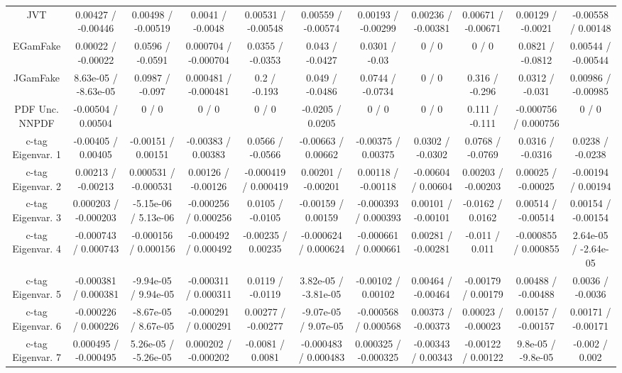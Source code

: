 \begin{table}[htbp]
\begin{center}
\begin{tabular}{|c|c|c|c|c|c|c|c|c|c|c|}
  JVT & 0.00427 / -0.00446 & 0.00498 / -0.00519 & 0.0041 / -0.0048 & 0.00531 / -0.00548 & 0.00559 / -0.00574 & 0.00193 / -0.00299 & 0.00236 / -0.00381 & 0.00671 / -0.00671 & 0.00129 / -0.0021 & -0.00558 / 0.00148 \\ 
  EGamFake & 0.00022 / -0.00022 & 0.0596 / -0.0591 & 0.000704 / -0.000704 & 0.0355 / -0.0353 & 0.043 / -0.0427 & 0.0301 / -0.03 & 0 / 0 & 0 / 0 & 0.0821 / -0.0812 & 0.00544 / -0.00544 \\ 
  JGamFake & 8.63e-05 / -8.63e-05 & 0.0987 / -0.097 & 0.000481 / -0.000481 & 0.2 / -0.193 & 0.049 / -0.0486 & 0.0744 / -0.0734 & 0 / 0 & 0.316 / -0.296 & 0.0312 / -0.031 & 0.00986 / -0.00985 \\ 
  PDF Unc. NNPDF & -0.00504 / 0.00504 & 0 / 0 & 0 / 0 & 0 / 0 & -0.0205 / 0.0205 & 0 / 0 & 0 / 0 & 0.111 / -0.111 & -0.000756 / 0.000756 & 0 / 0 \\ 
  c-tag Eigenvar. 1 & -0.00405 / 0.00405 & -0.00151 / 0.00151 & -0.00383 / 0.00383 & 0.0566 / -0.0566 & -0.00663 / 0.00662 & -0.00375 / 0.00375 & 0.0302 / -0.0302 & 0.0768 / -0.0769 & 0.0316 / -0.0316 & 0.0238 / -0.0238 \\ 
  c-tag Eigenvar. 2 & 0.00213 / -0.00213 & 0.000531 / -0.000531 & 0.00126 / -0.00126 & -0.000419 / 0.000419 & 0.00201 / -0.00201 & 0.00118 / -0.00118 & -0.00604 / 0.00604 & 0.00203 / -0.00203 & 0.00025 / -0.00025 & -0.00194 / 0.00194 \\ 
  c-tag Eigenvar. 3 & 0.000203 / -0.000203 & -5.15e-06 / 5.13e-06 & -0.000256 / 0.000256 & 0.0105 / -0.0105 & -0.00159 / 0.00159 & -0.000393 / 0.000393 & 0.00101 / -0.00101 & -0.0162 / 0.0162 & 0.00514 / -0.00514 & 0.00154 / -0.00154 \\ 
  c-tag Eigenvar. 4 & -0.000743 / 0.000743 & -0.000156 / 0.000156 & -0.000492 / 0.000492 & -0.00235 / 0.00235 & -0.000624 / 0.000624 & -0.000661 / 0.000661 & 0.00281 / -0.00281 & -0.011 / 0.011 & -0.000855 / 0.000855 & 2.64e-05 / -2.64e-05 \\ 
  c-tag Eigenvar. 5 & -0.000381 / 0.000381 & -9.94e-05 / 9.94e-05 & -0.000311 / 0.000311 & 0.0119 / -0.0119 & 3.82e-05 / -3.81e-05 & -0.00102 / 0.00102 & 0.00464 / -0.00464 & -0.00179 / 0.00179 & 0.00488 / -0.00488 & 0.0036 / -0.0036 \\ 
  c-tag Eigenvar. 6 & -0.000226 / 0.000226 & -8.67e-05 / 8.67e-05 & -0.000291 / 0.000291 & 0.00277 / -0.00277 & -9.07e-05 / 9.07e-05 & -0.000568 / 0.000568 & 0.00373 / -0.00373 & 0.00023 / -0.00023 & 0.00157 / -0.00157 & 0.00171 / -0.00171 \\ 
  c-tag Eigenvar. 7 & 0.000495 / -0.000495 & 5.26e-05 / -5.26e-05 & 0.000202 / -0.000202 & -0.0081 / 0.0081 & -0.000483 / 0.000483 & 0.000325 / -0.000325 & -0.00343 / 0.00343 & -0.00122 / 0.00122 & 9.8e-05 / -9.8e-05 & -0.002 / 0.002 \\ 

\end{tabular}
\end{center}
\end{table}
